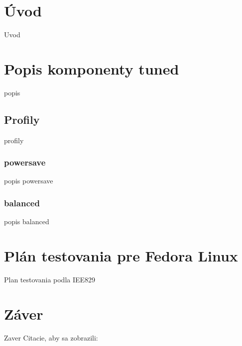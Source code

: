
\chapter{Úvod}
Uvod

\chapter{Popis komponenty tuned}
popis

\section{Profily}
profily
\subsection{powersave}
popis powersave
\subsection{balanced}
popis balanced

\chapter{Plán testovania pre Fedora Linux}
Plan testovania podla IEE829

\chapter{Záver}
Zaver
Citacie, aby sa zobrazili: \cite{Testovani_softwaru} \cite{Software_testing} \cite{Software_testing_patton}

